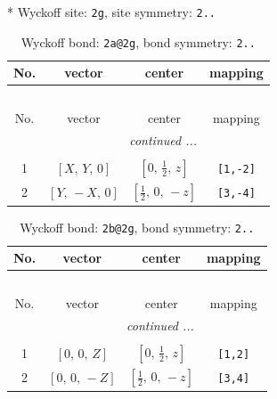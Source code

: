\documentclass[fleqn,8pt]{jsarticle}
\begin{document}
* Wyckoff site: {\tt 2g}, site symmetry: {\tt 2..}
\renewcommand{\arraystretch}{1.2}
\begin{longtable}{cccc}
\caption{Wyckoff bond: {\tt 2a@2g}, bond symmetry: {\tt 2..}}
 \\
 \hline \hline
No. & vector & center & mapping \\ \hline \endfirsthead

\multicolumn{3}{l}{\tablename\ \thetable{}} \\
 \hline \hline
No. & vector & center & mapping \\ \hline \endhead

 \hline \hline
\multicolumn{3}{r}{\footnotesize\it continued ...} \\ \endfoot

 \hline \hline
\multicolumn{3}{r}{} \\ \endlastfoot

1 & $\left[ X,\, Y,\, 0 \right]$ & $\left[ 0,\, \frac{1}{2},\, z \right]$ & {\tt [1,-2]} \\ \hline
2 & $\left[ Y,\, - X,\, 0 \right]$ & $\left[ \frac{1}{2},\, 0,\, - z \right]$ & {\tt [3,-4]} \\
\end{longtable}
\renewcommand{\arraystretch}{1.2}
\begin{longtable}{cccc}
\caption{Wyckoff bond: {\tt 2b@2g}, bond symmetry: {\tt 2..}}
 \\
 \hline \hline
No. & vector & center & mapping \\ \hline \endfirsthead

\multicolumn{3}{l}{\tablename\ \thetable{}} \\
 \hline \hline
No. & vector & center & mapping \\ \hline \endhead

 \hline \hline
\multicolumn{3}{r}{\footnotesize\it continued ...} \\ \endfoot

 \hline \hline
\multicolumn{3}{r}{} \\ \endlastfoot

1 & $\left[ 0,\, 0,\, Z \right]$ & $\left[ 0,\, \frac{1}{2},\, z \right]$ & {\tt [1,2]} \\ \hline
2 & $\left[ 0,\, 0,\, - Z \right]$ & $\left[ \frac{1}{2},\, 0,\, - z \right]$ & {\tt [3,4]} \\
\end{longtable}
\renewcommand{\arraystretch}{1.2}
\end{document}
